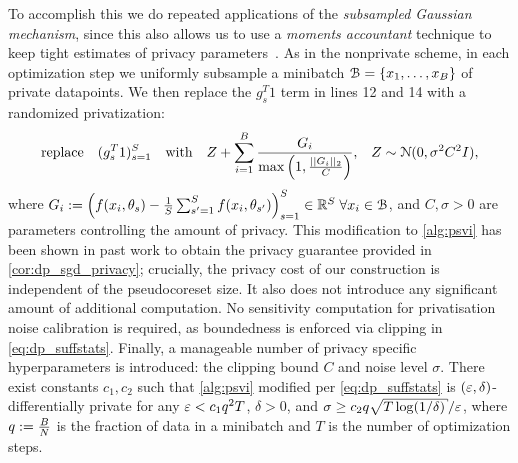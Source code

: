 To accomplish this we do repeated applications of the  \emph{subsampled
Gaussian mechanism}, since this also allows us to use a
\emph{moments accountant} technique
to keep tight estimates of
privacy parameters~\citep{abadi16, wang19}. As in the nonprivate scheme, in
each optimization step we uniformly subsample a minibatch $\mathcal{B} = \{x_1, \dots,
x_{B}\}$ of private datapoints. 
We then replace the $g_s^T1$ term in lines 12 and 14
with a randomized privatization:
\begin{align}
& \text{replace}\quad (g_s^T 1)_{s=1}^{S}\quad\text{with}\quad  Z+\sum_{i=1}^{B}{\frac{G_{i}}{\max\left(1,\frac{||G_{i}||_2}{C}\right)}},
&Z \sim \mathcal{N}(0, \sigma^2 C^2 I),\label{eq:dp_suffstats}
\end{align}
where $G_i:=\left( f(x_i, \theta_s) - \frac{1}{S} \sum_{s'=1}^{S} f(x_i, \theta_{s'})\right)_{s=1}^{S} \in \mathbb{R}^S  \; \forall x_i \in \mathcal{B}$,
and $C, \sigma > 0$ are parameters controlling the amount of privacy.
This modification to \cref{alg:psvi} has been shown in past work to obtain the privacy guarantee provided in \cref{cor:dp_sgd_privacy};
crucially, the privacy cost of our construction is independent of the pseudocoreset size.
It also does not introduce any significant amount of additional computation.
No sensitivity computation for privatisation noise calibration is required, as boundedness is 
enforced via clipping in \cref{eq:dp_suffstats}. Finally, a manageable number of privacy specific 
hyperparameters is introduced: the clipping bound $C$ and noise level $\sigma$.
 There exist constants $ c_1, c_2 $ such that \cref{alg:psvi} modified per \cref{eq:dp_suffstats} 
is $(\varepsilon, \delta)$-differentially
private for any $ \varepsilon < c_1q^2T$, $ \delta > 0$, and  \mbox{$ \sigma
\geq c_2q \sqrt{T \log(1/\delta)}/\veps$}, where $ {q := \frac{B}{N} }$
is the fraction of data in a minibatch and $T$ is the number of optimization
steps. \label{cor:dp_sgd_privacy}
\encor
%

